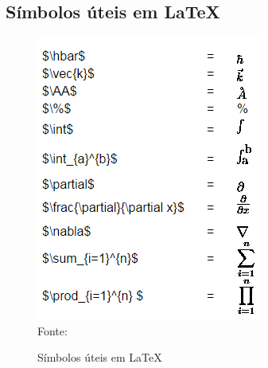 \begin{anexosenv}
\chapter{Símbolos úteis em \LaTeX}
\begin{figure}[H]
	\begin{center}
		\caption{\label{fig_anexoc}Símbolos úteis em \LaTeX}
		\includegraphics[scale=1.0]{USPSC-img/USPSC-SimbolosUteis.png} \\
		Fonte: 
	\end{center}	
\end{figure}



\end{anexosenv}
